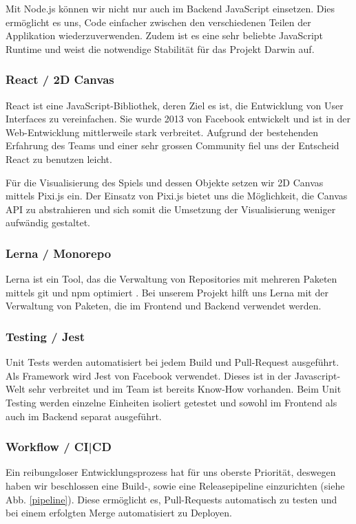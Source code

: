 \documentclass[11pt,a4paper,titlepage]{article}
\begin{document}
Mit Node.js können wir nicht nur auch im Backend JavaScript einsetzen. Dies ermöglicht es uns, Code einfacher zwischen den verschiedenen Teilen der Applikation wiederzuverwenden. Zudem ist es eine sehr beliebte JavaScript Runtime \cite{node-git} und weist die notwendige Stabilität für das Projekt Darwin auf.

\subsubsection{React / 2D Canvas}
React ist eine JavaScript-Bibliothek, deren Ziel es ist, die Entwicklung von User Interfaces zu vereinfachen. Sie wurde 2013 von Facebook entwickelt \cite{react-handbook} und ist in der Web-Entwicklung mittlerweile stark verbreitet.
Aufgrund der bestehenden Erfahrung des Teams und einer sehr grossen Community fiel uns der Entscheid React zu benutzen leicht.

Für die Visualisierung des Spiels und dessen Objekte setzen wir 2D Canvas mittels Pixi.js ein. Der Einsatz von Pixi.js bietet uns die Möglichkeit, die Canvas API zu abstrahieren und sich somit die Umsetzung der Visualisierung weniger aufwändig gestaltet.

\subsubsection{Lerna / Monorepo}
Lerna ist ein Tool, das die Verwaltung von Repositories mit mehreren Paketen mittels git und npm optimiert \cite{lerna}. Bei unserem Projekt hilft uns Lerna mit der Verwaltung von Paketen, die im Frontend und Backend verwendet werden.

\subsubsection{Testing / Jest}
Unit Tests werden automatisiert bei jedem Build und Pull-Request ausgeführt.
Als Framework wird Jest von Facebook verwendet. Dieses ist in der Javascript-Welt sehr verbreitet und im Team ist bereits Know-How vorhanden.
Beim Unit Testing werden einzelne Einheiten isoliert getestet und sowohl im Frontend als auch im Backend separat ausgeführt.

\subsubsection{Workflow / CI|CD}
Ein reibungsloser Entwicklungsprozess hat für uns oberste Priorität, deswegen haben wir beschlossen eine Build-, sowie eine Releasepipeline einzurichten (siehe Abb. \ref{pipeline}). Diese ermöglicht es, Pull-Requests automatisch zu testen und bei einem erfolgten Merge automatisiert zu Deployen.
\end{document}
